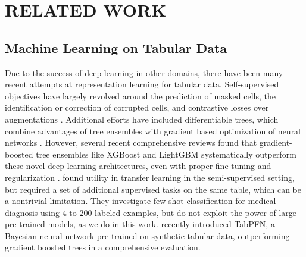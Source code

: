 \section{RELATED WORK}

\subsection{Machine Learning on Tabular Data} Due to the success of deep learning in  other domains, there have been many recent attempts at representation learning for tabular data. Self-supervised objectives have largely revolved around the prediction of masked cells, the identification or correction of corrupted cells, and contrastive losses over augmentations \citep{bahri_scarf_2022, somepalli_saint_2021, yoon_vime_2020, arik_tabnet_2021, huang_tabtransformer_2020}. Additional efforts have included differentiable trees, which combine advantages of tree ensembles with gradient based optimization of neural networks \citep{kontschieder_deep_2015, popov_neural_2019}. However, several recent comprehensive reviews \citep{shwartz-ziv_tabular_2021, borisov_deep_2022, grinsztajn_why_2022} found that gradient-boosted tree ensembles like XGBoost \citep{chen_xgboost_2016} and LightGBM \citep{ke_lightgbm_2017} systematically outperform  these novel deep learning architectures, even with proper fine-tuning and regularization \citep{kadra2021well}.
\citet{levin_transfer_2022} found utility in transfer learning in the semi-supervised setting, but required a set of additional supervised tasks on the same table, which can be a nontrivial limitation. They investigate few-shot classification for medical diagnosis using 4 to 200 labeled examples, but do not exploit the power of large pre-trained models, as we do in this work.
\citet{hollmann2022tabpfn} recently introduced TabPFN, a Bayesian neural network pre-trained on synthetic tabular data, outperforming gradient boosted trees in a comprehensive evaluation.

